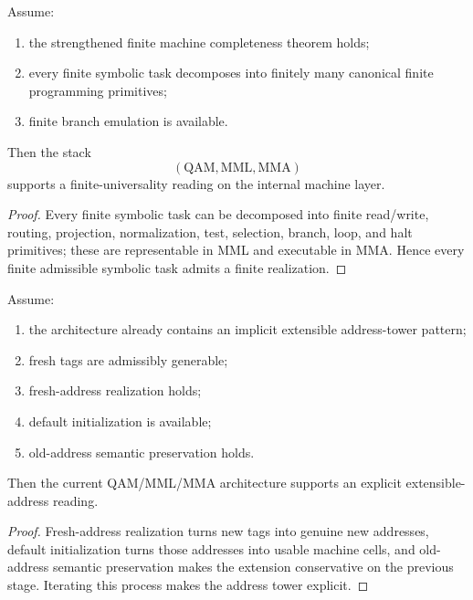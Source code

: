 \begin{theorem}\label{thm:first-finite-universality-computational-layer}
Assume:
\begin{enumerate}[leftmargin=2em]
    \item the strengthened finite machine completeness theorem holds;
    \item every finite symbolic task decomposes into finitely many canonical finite programming primitives;
    \item finite branch emulation is available.
\end{enumerate}
Then the stack
\[
(\mathrm{QAM},\mathrm{MML},\mathrm{MMA})
\]
supports a finite-universality reading on the internal machine layer.
\end{theorem}

\begin{proof}
Every finite symbolic task can be decomposed into finite read/write, routing, projection, normalization, test, selection, branch, loop, and halt primitives; these are representable in MML and executable in MMA. Hence every finite admissible symbolic task admits a finite realization.
\end{proof}

\begin{theorem}[Fresh tag = fresh address reading theorem]\label{thm:fresh-tag-equals-fresh-address-computational-layer}
Assume:
\begin{enumerate}[leftmargin=2em]
    \item the architecture already contains an implicit extensible address-tower pattern;
    \item fresh tags are admissibly generable;
    \item fresh-address realization holds;
    \item default initialization is available;
    \item old-address semantic preservation holds.
\end{enumerate}
Then the current QAM/MML/MMA architecture supports an explicit extensible-address reading.
\end{theorem}

\begin{proof}
Fresh-address realization turns new tags into genuine new addresses, default initialization turns those addresses into usable machine cells, and old-address semantic preservation makes the extension conservative on the previous stage. Iterating this process makes the address tower explicit.
\end{proof}

